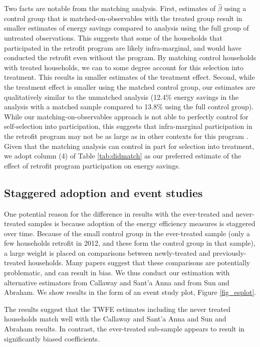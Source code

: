 \documentclass{article}
\begin{document}
Two facts are notable from the matching analysis.  First, estimates of $\hat{\beta}$ using a control group that is matched-on-observables with the treated group result in smaller estimates of energy savings compared to analysis using the full group of untreated observations. This suggests that some of the households that participated in the retrofit program are likely infra-marginal, and would have conducted the retrofit even without the program. By matching control households with treated households, we can to some degree account for this selection into treatment. This results in smaller estimates of the treatment effect. Second, while the treatment effect is smaller using the matched control group, our estimates are qualitatively similar to the unmatched analysis (12.4\% energy savings in the analysis with a matched sample compared to 13.8\% using the full control group). While our matching-on-observables approach is not able to perfectly control for self-selection into participation, this suggests that infra-marginal participation in the retrofit program may not be as large as in other contexts for this program \citep{grosche2009willingness, boomhower2014credible}. Given that the matching analysis can control in part for selection into treatment, we adopt column (4) of Table \ref{tab:didmatch} as our preferred estimate of the effect of retrofit program participation on energy savings.



\subsection{Staggered adoption and event studies}
One potential reason for the difference in results with the ever-treated and never-treated samples is because adoption of the energy efficiency measures is staggered over time. Because of the small control group in the ever-treated sample (only a few households retrofit in 2012, and these form the control group in that sample), a large weight is placed on comparisons between newly-treated and previously-treated households. Many papers suggest that these comparisons are potentially problematic, and can result in bias.  We thus conduct our estimation with alternative estimators from Callaway and Sant'a Anna and from Sun and Abraham.  We show results in the form of an event study plot, Figure \ref{fig_esplot}.

The results suggest that the TWFE estimates including the never treated households match well with the Callaway and Sant'a Anna and Sun and Abraham results.  In contrast, the ever-treated sub-sample appears to result in significantly biased coefficients.
\end{document}
